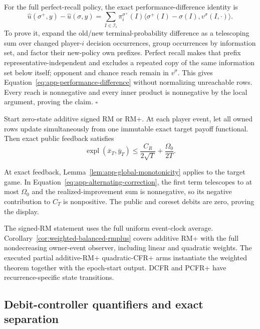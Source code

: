 For the full perfect-recall policy, the exact performance-difference identity
is
\begin{equation}
\widehat u(\sigma^+,y)-\widehat u(\sigma,y)
=\sum_{I\in\mathcal I_i}\pi_i^{\sigma^+}(I)
\langle\sigma^+(I)-\sigma(I),v^\sigma(I,\cdot)\rangle.
\label{eq:app-performance-difference}
\end{equation}
To prove it, expand the
old/new terminal-probability difference as a telescoping sum over changed
player-$i$ decision occurrences, group occurrences by information set, and
factor their new-policy own prefixes.  Perfect recall makes that prefix
representative-independent and excludes a repeated copy of the same
information set below itself; opponent and chance reach remain in
$v^\sigma$.  This gives Equation~\ref{eq:app-performance-difference} without
normalizing unreachable rows.  Every reach is nonnegative and every inner
product is nonnegative by the local argument, proving the claim.
\hfill$\square$

\begin{corollary}
Start zero-state additive signed RM or RM+.  At each player event, let all
owned rows update simultaneously from one immutable exact target payoff
functional.  Then exact public feedback satisfies
\begin{equation}
\operatorname{expl}(\bar x_T,\bar y_T)
\le\frac{C_R}{2\sqrt T}+\frac{\Omega_0}{2T}.
\label{eq:app-exact-boundary}
\end{equation}
\end{corollary}

At exact feedback, Lemma~\ref{lem:app-global-monotonicity} applies to the
target game.  In Equation~\ref{eq:app-alternating-correction}, the first term
telescopes to at most $\Omega_0$ and the realized-improvement sum is
nonnegative, so its negative contribution to $C_T$ is nonpositive.  The public
and coreset debits are zero, proving the display.

The signed-RM statement uses the full uniform event-clock average.
Corollary~\ref{cor:weighted-balanced-rmplus} covers additive RM+ with the full
nondecreasing owner-event observer, including linear and quadratic weights.
The executed partial additive-RM+ quadratic-CFR+ arms instantiate the weighted
theorem together with the epoch-start output.  DCFR and PCFR+ have
recurrence-specific state transitions.

\subsection{Debit-controller quantifiers and exact separation}
\label{app:debit-controller-proof}

